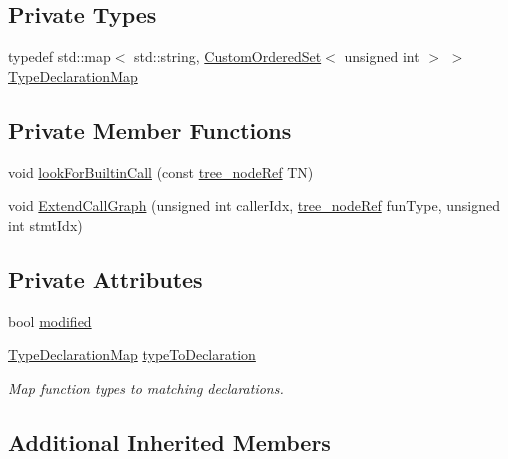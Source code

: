 \subsection*{Private Types}
\begin{DoxyCompactItemize}
\item 
typedef std\+::map$<$ std\+::string, \hyperlink{classCustomOrderedSet}{Custom\+Ordered\+Set}$<$ unsigned int $>$ $>$ \hyperlink{classCallGraphBuiltinCall_ac5000af275152e4c862dc90cfe1453d0}{Type\+Declaration\+Map}
\end{DoxyCompactItemize}
\subsection*{Private Member Functions}
\begin{DoxyCompactItemize}
\item 
void \hyperlink{classCallGraphBuiltinCall_a3c3f8ffb197a72edd1ea375b7ffa5d1d}{look\+For\+Builtin\+Call} (const \hyperlink{tree__node_8hpp_a6ee377554d1c4871ad66a337eaa67fd5}{tree\+\_\+node\+Ref} TN)
\item 
void \hyperlink{classCallGraphBuiltinCall_a454e14be35421e6dcc70c06ae958d588}{Extend\+Call\+Graph} (unsigned int caller\+Idx, \hyperlink{tree__node_8hpp_a6ee377554d1c4871ad66a337eaa67fd5}{tree\+\_\+node\+Ref} fun\+Type, unsigned int stmt\+Idx)
\end{DoxyCompactItemize}
\subsection*{Private Attributes}
\begin{DoxyCompactItemize}
\item 
bool \hyperlink{classCallGraphBuiltinCall_a7415263ac5a10f89975d1d8220c5b92b}{modified}
\item 
\hyperlink{classCallGraphBuiltinCall_ac5000af275152e4c862dc90cfe1453d0}{Type\+Declaration\+Map} \hyperlink{classCallGraphBuiltinCall_aa7f85e6b78133e24ae7c87ab42bcc497}{type\+To\+Declaration}
\begin{DoxyCompactList}\small\item\em Map function types to matching declarations. \end{DoxyCompactList}\end{DoxyCompactItemize}
\subsection*{Additional Inherited Members}


